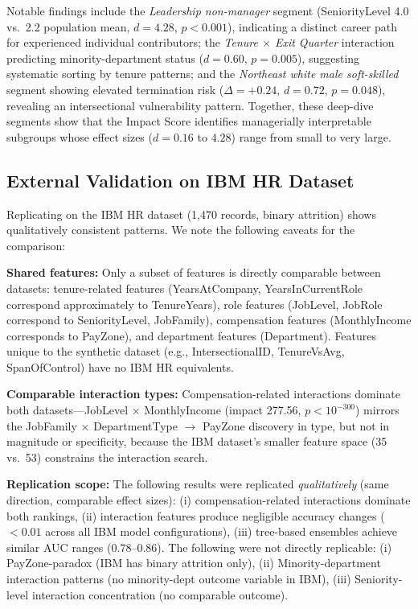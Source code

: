 \documentclass[conference]{IEEEtran}
\begin{document}
Notable findings include the \textit{Leadership non-manager} segment (SeniorityLevel 4.0 vs.~2.2 population mean, $d = 4.28$, $p < 0.001$), indicating a distinct career path for experienced individual contributors; the \textit{Tenure $\times$ Exit Quarter} interaction predicting minority-department status ($d = 0.60$, $p = 0.005$), suggesting systematic sorting by tenure patterns; and the \textit{Northeast white male soft-skilled} segment showing elevated termination risk ($\Delta = +0.24$, $d = 0.72$, $p = 0.048$), revealing an intersectional vulnerability pattern. Together, these deep-dive segments show that the Impact Score identifies managerially interpretable subgroups whose effect sizes ($d = 0.16$ to $4.28$) range from small to very large.

\subsection{External Validation on IBM HR Dataset}

Replicating on the IBM HR dataset \cite{ibmhr} (1,470 records, binary attrition) shows qualitatively consistent patterns. We note the following caveats for the comparison:

\textbf{Shared features:} Only a subset of features is directly comparable between datasets: tenure-related features (YearsAtCompany, YearsInCurrentRole correspond approximately to TenureYears), role features (JobLevel, JobRole correspond to SeniorityLevel, JobFamily), compensation features (MonthlyIncome corresponds to PayZone), and department features (Department). Features unique to the synthetic dataset (e.g., IntersectionalID, TenureVsAvg, SpanOfControl) have no IBM HR equivalents.

\textbf{Comparable interaction types:} Compensation-related interactions dominate both datasets---JobLevel $\times$ MonthlyIncome (impact 277.56, $p < 10^{-300}$) mirrors the JobFamily $\times$ DepartmentType $\to$ PayZone discovery in type, but not in magnitude or specificity, because the IBM dataset's smaller feature space (35 vs.~53) constrains the interaction search.

\textbf{Replication scope:} The following results were replicated \textit{qualitatively} (same direction, comparable effect sizes): (i) compensation-related interactions dominate both rankings, (ii) interaction features produce negligible accuracy changes ($<0.01$ across all IBM model configurations), (iii) tree-based ensembles achieve similar AUC ranges ($0.78$--$0.86$). The following were not directly replicable: (i) PayZone-paradox (IBM has binary attrition only), (ii) Minority-department interaction patterns (no minority-dept outcome variable in IBM), (iii) Seniority-level interaction concentration (no comparable outcome).
\end{document}
